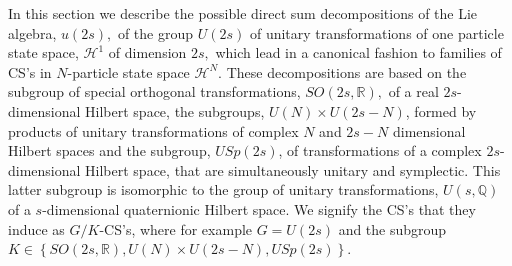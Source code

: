 \documentclass[12pt,aps,amsfonts,amssymb,tightenlines]{revtex4}%
\begin{document}
In this section we describe the possible direct sum decompositions of the Lie
algebra, $u(2s),$ of the group $U(2s)$ of unitary transformations of one
particle state space, $\mathcal{H}^{1}$ of dimension $2s,$ which lead in a
canonical fashion to families of CS's in $N$-particle state space
$\mathcal{H}^{N}$. These decompositions are based on the subgroup of special
orthogonal transformations, $SO\left(  2s,\mathbb{R}\right)  ,$ of a real
$2s$-dimensional Hilbert space, the subgroups, $U\left(  N\right)  \times
U\left(  2s-N\right)  $, formed by products of unitary transformations of
complex $N$ and $2s-N$ dimensional Hilbert spaces and the subgroup,
$USp\left(  2s\right)  $, of transformations of a complex $2s$-dimensional
Hilbert space, that are simultaneously unitary and symplectic. This latter
subgroup is isomorphic to the group of unitary transformations, $U\left(
s,\mathbb{Q}\right)  $ of a $s$-dimensional quaternionic Hilbert space. We
signify the CS's that they induce as $G/K$-CS's, where for example $G=U\left(
2s\right)  $ and the subgroup $K\in\left\{  SO\left(  2s,\mathbb{R}\right)
,U\left(  N\right)  \times U\left(  2s-N\right)  ,USp\left(  2s\right)
\right\}  $.
\end{document}
